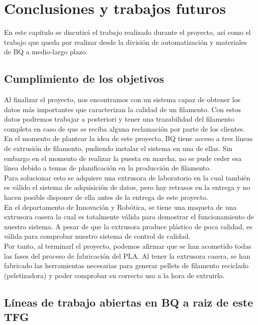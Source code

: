 \chapter{Conclusiones y trabajos futuros}
\label{cap:conclus}

En este capítulo se discutirá el trabajo realizado durante el proyecto, así como el trabajo que queda por realizar desde la división de automatización y materiales de BQ a medio-largo plazo.

\section{Cumplimiento de los objetivos}

Al finalizar el proyecto, nos encontramos con un sistema capaz de obtener los datos más importantes que caracterizan la calidad de un filamento. Con estos datos podremos trabajar a posteriori y tener una trazabilidad del filamento completa en caso de que se reciba alguna reclamación por parte de los clientes.\\

En el momento de plantear la idea de este proyecto, BQ tiene acceso a tres líneas de extrusión de filamento,  pudiendo instalar el sistema en una de ellas. Sin embargo en el momento de realizar la puesta en marcha, no se pude ceder esa línea debido a temas de planificación en la producción de filamento.\\

Para solucionar esto se adquiere una extrusora de laboratorio en la cual también es válido el sistema de adquisición de datos, pero hay retrasos en la entrega y no hacen posible disponer de ella antes de la entrega de este proyecto.\\

En el departamento de Innovación y Robótica, se tiene una maqueta de una extrusora casera la cual es totalmente válida para demostrar el funcionamiento de nuestro sistema. A pesar de que la extrusora produce plástico de poca calidad, es válida para comprobar nuestro sistema de control de calidad.\\

Por tanto, al terminarl el proyecto, podemos afirmar que se han acometido todas las fases del proceso de fabricación del PLA. Al tener la extrusora casera, se han fabricado las herramientas necesarias para generar pellets de filamento reciclado (peletizadora) y poder comprobar su correcto uso a la hora de extruirlo.

\section{Líneas de trabajo abiertas en BQ a raiz de este TFG}

